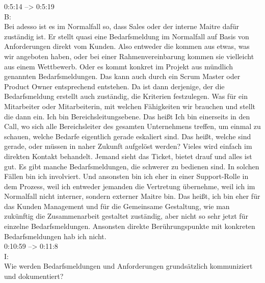 0:5:14 --> 0:5:19\\
B:\\
Bei adesso ist es im Normalfall so, dass Sales oder der interne Maitre dafür zuständig ist. Er stellt quasi eine Bedarfsmeldung im Normalfall auf Basis von Anforderungen direkt vom Kunden. Also entweder die kommen aus etwas, was wir angeboten haben, oder bei einer Rahmenvereinbarung kommen sie vielleicht aus einem Wettbewerb. Oder es kommt konkret im Projekt aus mündlich genannten Bedarfsmeldungen. Das kann auch durch ein Scrum Master oder Product Owner entsprechend entstehen. Da ist dann derjenige, der die Bedarfsmeldung erstellt auch zuständig, die Kriterien festzulegen. Was für ein Mitarbeiter oder Mitarbeiterin, mit welchen Fähigkeiten wir brauchen und stellt die dann ein. Ich bin Bereichsleitungsebene. Das heißt Ich bin einerseits in den Call, wo sich alle Bereichsleiter des gesamten Unternehmens treffen, um einmal zu schauen, welche Bedarfe eigentlich gerade eskaliert sind. Das heißt, welche sind gerade, oder müssen in naher Zukunft aufgelöst werden? Vieles wird einfach im direkten Kontakt behandelt. Jemand sieht das Ticket, bietet drauf und alles ist gut. Es gibt manche Bedarfsmeldungen, die schwerer zu bedienen sind. In solchen Fällen bin ich involviert. Und ansonsten bin ich eher in einer Support-Rolle in dem Prozess, weil ich entweder jemanden die Vertretung übernehme, weil ich im Normalfall nicht interner, sondern externer Maitre bin. Das heißt, ich bin eher für das Kunden Management und für die Gemeinsame Gestaltung, wie man zukünftig die Zusammenarbeit gestaltet zuständig, aber nicht so sehr jetzt für einzelne Bedarfsmeldungen. Ansonsten direkte Berührungspunkte mit konkreten Bedarfsmeldungen hab ich nicht.\\

0:10:59 --> 0:11:8\\
I:\\
Wie werden Bedarfsmeldungen und Anforderungen grundsätzlich kommuniziert und dokumentiert?\\

